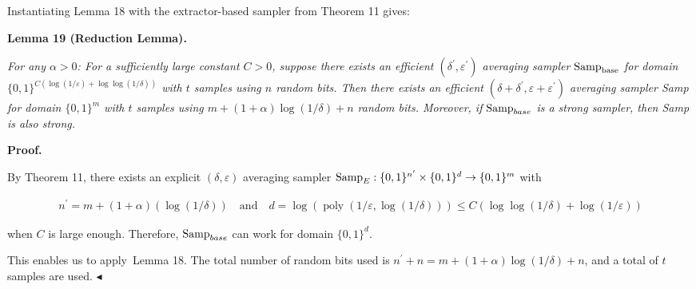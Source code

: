 Instantiating Lemma 18 with the extractor-based sampler from Theorem 11 gives:\par





\par\medskip\noindent\textbf{
\textbf{Lemma 19}\textbf{ }(Reduction Lemma)\textbf{.}
}\par



\emph{For any $\alpha>0$: For a sufficiently large constant $C>0$, suppose there exists an efficient $({\delta^{\prime}},\varepsilon^{\prime})$ averaging sampler $\textup{{Samp}}_{\text{base}}$ for domain $\{0,1\}^{C(\log(1/\varepsilon)+\log\log(1/\delta))}$ with $t$ samples using $n$ random bits. Then there exists an efficient $(\delta+\delta^{\prime},\varepsilon+\varepsilon^{\prime})$ averaging sampler Samp for domain $\{0,1\}^{m}$ with $t$ samples using
$m+(1+\alpha)\log(1/\delta)+n$
random bits. Moreover, if $\textup{{Samp}}_{base}$ is a strong sampler, then Samp is also strong.}\par







\par\medskip\noindent\textbf{Proof.}\par




By Theorem 11, there exists an explicit $(\delta,\varepsilon)$ averaging sampler $\textup{{Samp}}_{E}:\{0,1\}^{n^{\prime}}\times\{0,1\}^{d}\to\{0,1\}^{m}$ with\par


\[\begin{gathered}
n^{\prime}={m+(1+\alpha)(\log(1/\delta))}\quad\text{and}\quad d=\log(\operatorname*{poly}(1/\varepsilon,\log(1/\delta)))\leq C(\log\log(1/\delta)+\log(1/\varepsilon))
\end{gathered}\]


when $C$ is large enough.
Therefore, $\textup{{Samp}}_{base}$ can work for domain $\{0,1\}^{d}$.\par




This enables us to apply Lemma 18. The total number of random bits used is $n^{\prime}+n=m+(1+\alpha)\log(1/\delta)+n$, and a total of $t$ samples are used.
$\blacktriangleleft$\par




